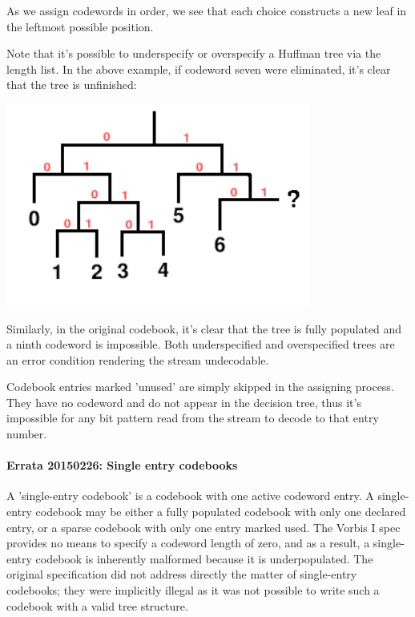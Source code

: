 As we assign codewords in order, we see that each choice constructs a
new leaf in the leftmost possible position.

Note that it's possible to underspecify or overspecify a Huffman tree
via the length list.  In the above example, if codeword seven were
eliminated, it's clear that the tree is unfinished:

\begin{center}
\includegraphics[width=10cm]{hufftree-under}
\end{center}


Similarly, in the original codebook, it's clear that the tree is fully
populated and a ninth codeword is impossible.  Both underspecified and
overspecified trees are an error condition rendering the stream
undecodable.

Codebook entries marked 'unused' are simply skipped in the assigning
process.  They have no codeword and do not appear in the decision
tree, thus it's impossible for any bit pattern read from the stream to
decode to that entry number.

\paragraph{Errata 20150226: Single entry codebooks}

A 'single-entry codebook' is a codebook with one active codeword
entry. A single-entry codebook may be either a fully populated
codebook with only one declared entry, or a sparse codebook with only
one entry marked used. The Vorbis I spec provides no means to specify
a codeword length of zero, and as a result, a single-entry codebook is
inherently malformed because it is underpopulated.  The original
specification did not address directly the matter of single-entry
codebooks; they were implicitly illegal as it was not possible to
write such a codebook with a valid tree structure.


